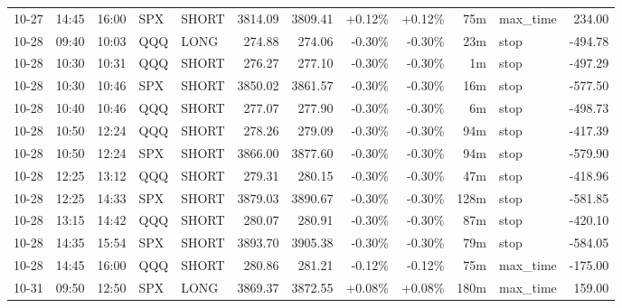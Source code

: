 \documentclass[11pt,a4paper,twoside]{article}
\begin{document}
\begin{center}
\begin{longtable}{>{\color{txtmain}}l l l l l r r r r r >{\color{txtmain}}l r}
10-27 & 14:45 & 16:00 & SPX & SHORT & 3814.09 & 3809.41 & \textcolor{wingreen}{+0.12\%} & \textcolor{wingreen}{+0.12\%} & 75m & max\_time & \textcolor{wingreen}{234.00} \\
10-28 & 09:40 & 10:03 & QQQ & LONG & 274.88 & 274.06 & \textcolor{lossred}{-0.30\%} & \textcolor{lossred}{-0.30\%} & 23m & stop & \textcolor{lossred}{-494.78} \\
10-28 & 10:30 & 10:31 & QQQ & SHORT & 276.27 & 277.10 & \textcolor{lossred}{-0.30\%} & \textcolor{lossred}{-0.30\%} & 1m & stop & \textcolor{lossred}{-497.29} \\
10-28 & 10:30 & 10:46 & SPX & SHORT & 3850.02 & 3861.57 & \textcolor{lossred}{-0.30\%} & \textcolor{lossred}{-0.30\%} & 16m & stop & \textcolor{lossred}{-577.50} \\
10-28 & 10:40 & 10:46 & QQQ & SHORT & 277.07 & 277.90 & \textcolor{lossred}{-0.30\%} & \textcolor{lossred}{-0.30\%} & 6m & stop & \textcolor{lossred}{-498.73} \\
10-28 & 10:50 & 12:24 & QQQ & SHORT & 278.26 & 279.09 & \textcolor{lossred}{-0.30\%} & \textcolor{lossred}{-0.30\%} & 94m & stop & \textcolor{lossred}{-417.39} \\
10-28 & 10:50 & 12:24 & SPX & SHORT & 3866.00 & 3877.60 & \textcolor{lossred}{-0.30\%} & \textcolor{lossred}{-0.30\%} & 94m & stop & \textcolor{lossred}{-579.90} \\
10-28 & 12:25 & 13:12 & QQQ & SHORT & 279.31 & 280.15 & \textcolor{lossred}{-0.30\%} & \textcolor{lossred}{-0.30\%} & 47m & stop & \textcolor{lossred}{-418.96} \\
10-28 & 12:25 & 14:33 & SPX & SHORT & 3879.03 & 3890.67 & \textcolor{lossred}{-0.30\%} & \textcolor{lossred}{-0.30\%} & 128m & stop & \textcolor{lossred}{-581.85} \\
10-28 & 13:15 & 14:42 & QQQ & SHORT & 280.07 & 280.91 & \textcolor{lossred}{-0.30\%} & \textcolor{lossred}{-0.30\%} & 87m & stop & \textcolor{lossred}{-420.10} \\
10-28 & 14:35 & 15:54 & SPX & SHORT & 3893.70 & 3905.38 & \textcolor{lossred}{-0.30\%} & \textcolor{lossred}{-0.30\%} & 79m & stop & \textcolor{lossred}{-584.05} \\
10-28 & 14:45 & 16:00 & QQQ & SHORT & 280.86 & 281.21 & \textcolor{lossred}{-0.12\%} & \textcolor{lossred}{-0.12\%} & 75m & max\_time & \textcolor{lossred}{-175.00} \\
10-31 & 09:50 & 12:50 & SPX & LONG & 3869.37 & 3872.55 & \textcolor{wingreen}{+0.08\%} & \textcolor{wingreen}{+0.08\%} & 180m & max\_time & \textcolor{wingreen}{159.00} \\

\end{longtable}
\end{center}
\end{document}
